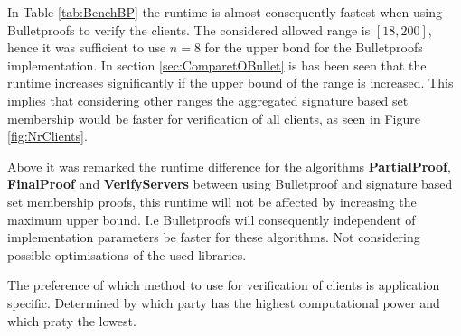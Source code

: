 In Table \ref{tab:BenchBP} the runtime is almost consequently fastest when using Bulletproofs to verify the clients. The considered allowed range is $[18,200]$, hence it was sufficient to use $n=8$ for the upper bond for the Bulletproofs implementation. In section \ref{sec:ComparetOBullet} is has been seen that the runtime increases significantly if the upper bound of the range is increased. This implies that considering other ranges the aggregated signature based set membership would be faster for verification of all clients, as seen in Figure \ref{fig:NrClients}. 

Above it was remarked the runtime difference for the algorithms \textbf{PartialProof}, \textbf{FinalProof} and \textbf{VerifyServers} between using Bulletproof and signature based set membership proofs, this runtime will not be affected by increasing the maximum upper bound. I.e Bulletproofs will consequently independent of implementation parameters be faster for these algorithms. Not considering possible optimisations of the used libraries. 

The preference of which method to use for verification of clients is application specific. Determined by which party has the highest computational power and which praty the lowest. 








